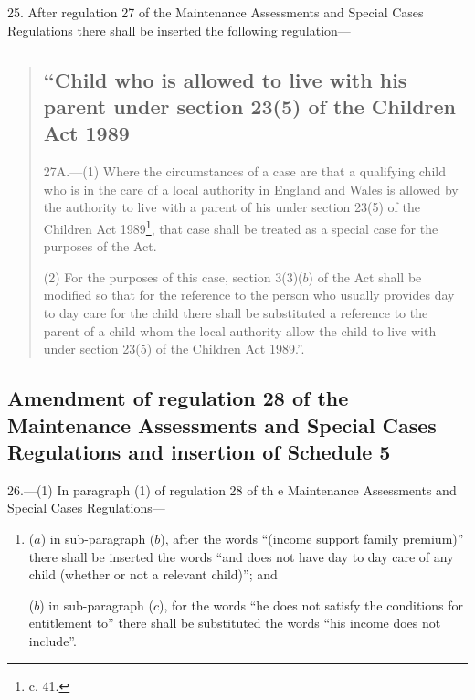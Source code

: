 \documentclass[12pt,a4paper]{article}
\begin{document}
25.  After regulation 27 of the Maintenance Assessments and Special Cases Regulations there shall be inserted the following regulation---
\begin{quotation}
\subsection*{“Child who is allowed to live with his parent under section 23(5) of the Children Act 1989}

27A.—(1) Where the circumstances of a case are that a qualifying child who is in the care of a local authority in England and Wales is allowed by the authority to live with a parent of his under section 23(5) of the Children Act 1989\footnote{ c. 41.}, that case shall be treated as a special case for the purposes of the Act.

(2) For the purposes of this case, section 3(3)($b$) of the Act shall be modified so that for the reference to the person who usually provides day to day care for the child there shall be substituted a reference to the parent of a child whom the local authority allow the child to live with under section 23(5) of the Children Act 1989.”.
\end{quotation}

\subsection[26. Amendment of regulation 28 of the Maintenance Assessments and Special Cases Regulations and insertion of Schedule 5]{\sloppy Amendment of regulation 28 of the Maintenance Assessments and Special Cases Regulations and insertion of Schedule 5}

26.—(1) In paragraph (1) of regulation 28 of th
e Maintenance Assessments and Special Cases Regulations---
\begin{enumerate}\item[]
($a$) in sub-paragraph ($b$), after the words “(income support family premium)” there shall be inserted the words “and does not have day to day care of any child (whether or not a relevant child)”; and

($b$) in sub-paragraph ($c$), for the words “he does not satisfy the conditions for entitlement to” there shall be substituted the words “his income does not include”.
\end{enumerate}
\end{document}
